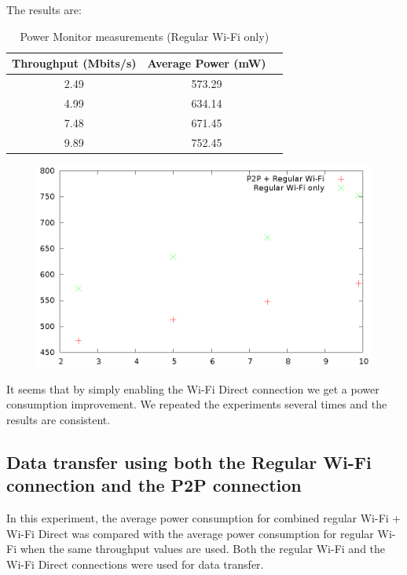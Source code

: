 The results are:

\begin{table}[h!]
  \centering
  \caption{Power Monitor measurements (Regular Wi-Fi only)}
  \label{tab:table1}
  \begin{tabular}{ccc}
    \toprule
    Throughput (Mbits/s) & Average Power (mW) \\
    \midrule
    2.49 & 573.29\\
    4.99 & 634.14\\
    7.48 & 671.45\\
    9.89 & 752.45\\
    \bottomrule
  \end{tabular}
\end{table}

\begin{figure}
\includegraphics{src/img/powervalues.eps}
\end{figure}

It seems that by simply enabling the Wi-Fi Direct connection we get a power consumption improvement. We repeated the experiments several times and the results are consistent.

\subsection{Data transfer using both the Regular Wi-Fi connection and the P2P connection}
\label{sub-sec:transfer-parallel2}

In this experiment, the average power consumption for combined regular Wi-Fi + Wi-Fi Direct was compared with the average power consumption for regular Wi-Fi when the same throughput values are used. Both the regular Wi-Fi and the Wi-Fi Direct connections were used for data transfer.

